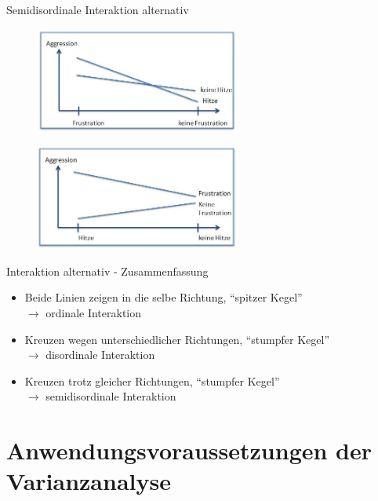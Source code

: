 \documentclass{beamer}
\begin{document}
	
	\begin{frame}{Semidisordinale Interaktion alternativ}
		\begin{figure}
			\centering
			\includegraphics[width=0.6\textwidth]{Bilder/HybrideInteraktion1.jpg}
		\end{figure}
		\begin{figure}
			\centering
			\includegraphics[width=0.6\textwidth]{Bilder/HybrideInteraktion2.jpg}
		\end{figure}
	\end{frame}
	
	\begin{frame}{Interaktion alternativ - Zusammenfassung}
		\begin{itemize}
			\item Beide Linien zeigen in die selbe Richtung, ``spitzer Kegel''\\
			$\rightarrow$ ordinale Interaktion
			\item Kreuzen wegen unterschiedlicher Richtungen, ``stumpfer Kegel''\\
			$\rightarrow$ disordinale Interaktion
			\item Kreuzen trotz gleicher Richtungen, ``stumpfer Kegel''\\
			$\rightarrow$ semidisordinale Interaktion
		\end{itemize}
	\end{frame}
	
	\section{Anwendungsvoraussetzungen der Varianzanalyse}
	
\end{document}
